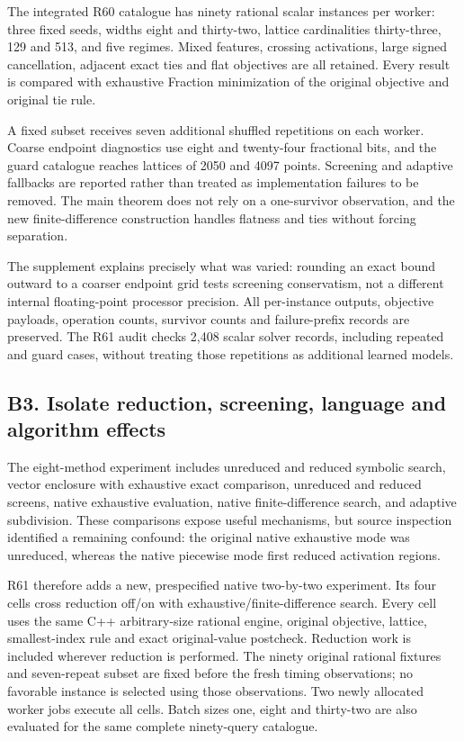 The integrated R60 catalogue has ninety rational scalar instances per
worker: three fixed seeds, widths eight and thirty-two, lattice
cardinalities thirty-three, 129 and 513, and five regimes. Mixed
features, crossing activations, large signed cancellation, adjacent
exact ties and flat objectives are all retained. Every result is
compared with exhaustive Fraction minimization of the original objective
and original tie rule.

A fixed subset receives seven additional shuffled repetitions on each
worker. Coarse endpoint diagnostics use eight and twenty-four fractional
bits, and the guard catalogue reaches lattices of 2050 and 4097 points.
Screening and adaptive fallbacks are reported rather than treated as
implementation failures to be removed. The main theorem does not rely on
a one-survivor observation, and the new finite-difference construction
handles flatness and ties without forcing separation.

The supplement explains precisely what was varied: rounding an exact
bound outward to a coarser endpoint grid tests screening conservatism,
not a different internal floating-point processor precision. All
per-instance outputs, objective payloads, operation counts, survivor
counts and failure-prefix records are preserved. The R61 audit checks
2,408 scalar solver records, including repeated and guard cases, without
treating those repetitions as additional learned models.

\hypertarget{b3.-isolate-reduction-screening-language-and-algorithm-effects}{%
\subsection{B3. Isolate reduction, screening, language and algorithm
effects}\label{b3.-isolate-reduction-screening-language-and-algorithm-effects}}

The eight-method experiment includes unreduced and reduced symbolic
search, vector enclosure with exhaustive exact comparison, unreduced and
reduced screens, native exhaustive evaluation, native finite-difference
search, and adaptive subdivision. These comparisons expose useful
mechanisms, but source inspection identified a remaining confound: the
original native exhaustive mode was unreduced, whereas the native
piecewise mode first reduced activation regions.

R61 therefore adds a new, prespecified native two-by-two experiment. Its
four cells cross reduction off/on with exhaustive/finite-difference
search. Every cell uses the same C++ arbitrary-size rational engine,
original objective, lattice, smallest-index rule and exact
original-value postcheck. Reduction work is included wherever reduction
is performed. The ninety original rational fixtures and seven-repeat
subset are fixed before the fresh timing observations; no favorable
instance is selected using those observations. Two newly allocated
worker jobs execute all cells. Batch sizes one, eight and thirty-two are
also evaluated for the same complete ninety-query catalogue.

